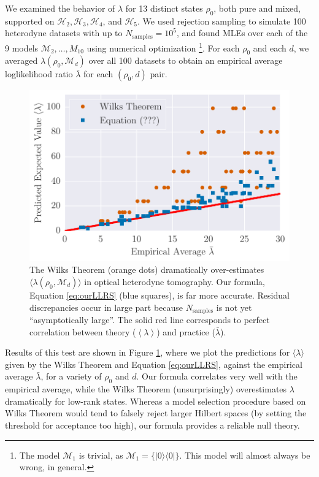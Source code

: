 \documentclass[aps,pra, twocolumn]{revtex4-1}
\newcommand{\M}{\mathcal{M}}
\newcommand{\expect}[1]{\ensuremath{\left\langle#1\right\rangle}}
\begin{document}
We examined the behavior of $\lambda$ for 13 distinct states $\rho_{0}$, both pure and mixed, supported on $\mathcal{H}_{2}, \mathcal{H}_{3}, \mathcal{H}
_{4}$, and $\mathcal{H}_{5}$.  We used rejection sampling to simulate 100 heterodyne datasets with up to $N_{\mathrm{samples}}=10^5$, and found MLEs over each of the 9 models $\M_2, \ldots, M_{10}$ using numerical optimization \footnote{The model $\M_{1}$ is trivial, as $\M_{1} = \{|0\rangle \langle 0|\}$. This model will almost always be wrong, in general.}.  For each $\rho_{0}$ and each $d$, we averaged $\lambda(\rho_{0}, \M_{d})$ over all 100 datasets to obtain an empirical average loglikelihood ratio $\bar{\lambda}$ for each $(\rho_0,d)$ pair.

\begin{figure}[h]
 \includegraphics[width=\columnwidth]{Images/Figure_7.pdf}
 \caption{The Wilks Theorem (orange dots) dramatically over-estimates $\langle\lambda(\rho_{0}, \M_{d})\rangle$ in optical heterodyne tomography. Our formula, Equation \ref{eq:ourLLRS} (blue squares), is far more accurate. Residual discrepancies occur in large part because $N_{\mathrm{samples}}$ is not yet ``asymptotically large''. The solid red line corresponds to perfect correlation between theory ($\expect{\lambda}$) and practice ($\bar\lambda$).}
 \label{fig:modelcomp}
\end{figure}

Results of this test are shown in Figure \ref{fig:modelcomp}, where we plot the predictions for $\langle \lambda \rangle$ given by the Wilks Theorem and Equation \eqref{eq:ourLLRS}, against the empirical average $\bar\lambda$, for a variety of $\rho_{0}$ and $d$. Our formula correlates very well with the empirical average, while the Wilks Theorem (unsurprisingly) overestimates $\lambda$ dramatically for low-rank states.  Whereas a model selection procedure based on Wilks Theorem would tend to falsely reject larger Hilbert spaces (by setting the threshold for acceptance too high), our formula provides a reliable null theory.
\end{document}
